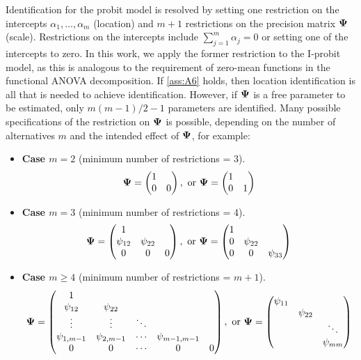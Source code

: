 Identification for the probit model is resolved by setting one restriction on the intercepts $\alpha_1,\dots,\alpha_m$ (location) and $m+1$ restrictions on the precision matrix ${\bm\Psi}$ (scale).
Restrictions on the intercepts include $\sum_{j=1}^m \alpha_j = 0$ or setting one of the intercepts to zero.
In this work, we apply the former restriction to the I-probit model, as this is analogous to the requirement of zero-mean functions in the functional ANOVA decomposition.
If \ref{ass:A6} holds, then location identification is all that is needed to achieve identification.
However, if ${\bm\Psi}$ is a free parameter to be estimated, only $m(m-1)/2-1$ parameters are identified.
Many possible specifications of the restriction on ${\bm\Psi}$ is possible, depending on the number of alternatives $m$ and the intended effect of ${\bm\Psi}$, for example:
\begin{itemize}
  \item \textbf{Case {\boldmath $m=2$}} (minimum number of restrictions = 3).
  \[
    {\bm\Psi} = 
    \begin{pmatrix}
    1 & \\
    0 &0 \\  
    \end{pmatrix},
    \text{ or }
    {\bm\Psi} = 
    \begin{pmatrix}
    1 & \\
    0 &1 \\  
    \end{pmatrix}
  \]
  \item \textbf{Case {\boldmath $m=3$}} (minimum number of restrictions = 4).
  \[
    {\bm\Psi} = 
    \begin{pmatrix}
    1 & \\
    \psi_{12} &\psi_{22} \\  
    0 &0 &0
    \end{pmatrix},
    \text{ or }
    {\bm\Psi} = 
    \begin{pmatrix}
    1 & \\
    0 &\psi_{22}  \\  
    0 &0 &\psi_{33}  
    \end{pmatrix}
  \]
    \item \textbf{Case {\boldmath $m\geq 4$}} (minimum number of restrictions = $m+1$).
  \[
    {\bm\Psi} = 
    \begin{pmatrix}
    1                    \\
    \psi_{12} &\psi_{22}  \\  
    \vdots    &\vdots    &\ddots \\
    \psi_{1,m-1}         &\psi_{2,m-1} &\cdots &\psi_{m-1,m-1} \\
    0         &0         &\cdots &0 &0
    \end{pmatrix},
    \text{ or }
    {\bm\Psi} = 
    \begin{pmatrix}
    \psi_{11} & \\
     &\psi_{22}  \\  
     & &\ddots \\
        &    &\psi_{mm} \\
    \end{pmatrix}
  \]
\end{itemize}

